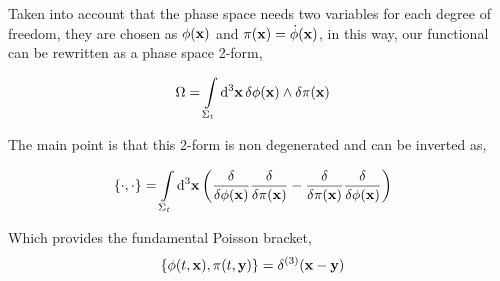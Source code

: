 Taken 
into account that the phase space needs two variables for each degree of freedom, they are chosen as $\phi(\vb x)$ and $\pi\qty(\vb x)=\dot\phi\qty(\vb x)$, 
in this way, our functional can be rewritten as a phase space 2-form,

\begin{align}
    \Omega &= \int\limits_{\Sigma_t}\dd[3]{\vb x}\delta\phi\qty(\vb x)\wedge\delta\pi\qty(\vb x)
\end{align}

The main point is that this 2-form is non degenerated and can be inverted as,

\begin{align}
    \acomm{\cdot}{\cdot} &= \int\limits_{\Sigma_t}\dd[3]{\vb x}\qty(\fdv{}{\phi\qty(\vb x)}\fdv{}{\pi\qty(\vb x)}-\fdv{}{\pi\qty(\vb x)}\fdv{}{\phi\qty(\vb x)})
\end{align}

Which provides the fundamental Poisson bracket,
\begin{align}
    \acomm{\phi\qty(t,\vb x)}{\pi\qty(t,\vb y)}&=\delta^{(3)}\qty(\vb x-\vb y) 
\end{align}



